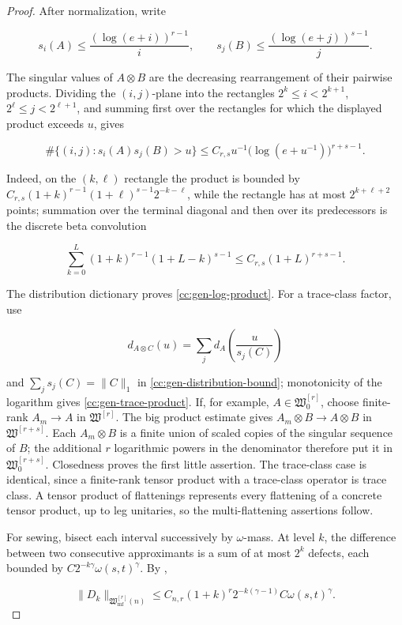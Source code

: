 \documentclass[10pt,reqno]{amsart}
\theoremstyle{plain}
\theoremstyle{definition}
\theoremstyle{remark}
\begin{document}
\begin{proof}
After normalization, write

\[
 s_i(A)\leq\frac{(\log(e+i))^{r-1}}i,
 \qquad
 s_j(B)\leq\frac{(\log(e+j))^{s-1}}j.
\]

The singular values of \(A\otimes B\) are the decreasing rearrangement of
their pairwise products.  Dividing the \((i,j)\)-plane into the rectangles
\(2^k\leq i<2^{k+1}\), \(2^\ell\leq j<2^{\ell+1}\), and summing first over
the rectangles for which the displayed product exceeds \(u\), gives

\[
 \#\{(i,j):s_i(A)s_j(B)>u\}
 \leq C_{r,s}u^{-1}
 \bigl(\log(e+u^{-1})\bigr)^{r+s-1}.
\]

Indeed, on the \((k,\ell)\) rectangle the product is bounded by
\(C_{r,s}(1+k)^{r-1}(1+\ell)^{s-1}2^{-k-\ell}\), while the rectangle has
at most \(2^{k+\ell+2}\) points; summation over the terminal diagonal and
then over its predecessors is the discrete beta convolution

\[
 \sum_{k=0}^{L}(1+k)^{r-1}(1+L-k)^{s-1}
 \leq C_{r,s}(1+L)^{r+s-1}.
\]

The distribution dictionary proves \eqref{cc:gen-log-product}.  For a
trace-class factor, use

\[
 d_{A\otimes C}(u)
 =\sum_jd_A\!\left(\frac{u}{s_j(C)}\right)
\]

and \(\sum_js_j(C)=\|C\|_1\) in
\eqref{cc:gen-distribution-bound}; monotonicity of the logarithm gives
\eqref{cc:gen-trace-product}.  If, for example,
\(A\in\mathfrak W^{[r]}_0\), choose finite-rank \(A_m\to A\) in
\(\mathfrak W^{[r]}\).  The big product estimate gives
\(A_m\otimes B\to A\otimes B\) in
\(\mathfrak W^{[r+s]}\).  Each \(A_m\otimes B\) is a finite union of
scaled copies of the singular sequence of \(B\); the additional \(r\)
logarithmic powers in the denominator therefore put it in
\(\mathfrak W^{[r+s]}_0\).  Closedness proves the first little
assertion.  The trace-class case is identical, since a finite-rank tensor
product with a trace-class operator is trace class.  A tensor
product of flattenings represents every flattening of a concrete tensor
product, up to leg unitaries, so the multi-flattening assertions follow.

For sewing, bisect each interval successively by \(\omega\)-mass.  At
level \(k\), the difference between two consecutive approximants is a sum
of at most \(2^k\) defects, each bounded by
\(C2^{-k\gamma}\omega(s,t)^\gamma\).  By
,

\[
 \|D_k\|_{\mathfrak W_{\mathrm{mf}}^{[r]}(n)}
 \leq C_{n,r}(1+k)^r2^{-k(\gamma-1)}
 C\omega(s,t)^\gamma.
\]


\end{proof}
\end{document}
